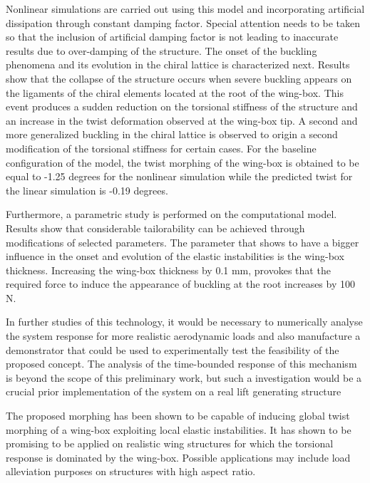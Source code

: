 Nonlinear simulations are carried out using this model and incorporating artificial dissipation through constant damping factor. Special attention needs to be taken so that the inclusion of artificial damping factor is not leading to inaccurate results due to over-damping of the structure. The onset of the buckling phenomena and its evolution in the chiral lattice is characterized next. Results show that the collapse of the structure occurs when severe buckling appears on the ligaments of the chiral elements located at the root of the wing-box. This event produces a sudden reduction on the torsional stiffness of the structure and an increase in the twist deformation observed at the wing-box tip. A second and more generalized buckling in the chiral lattice is observed to origin a second modification of the torsional stiffness for certain cases. For the baseline configuration of the model, the twist morphing of the wing-box is obtained to be equal to -1.25 degrees for the nonlinear simulation while the predicted twist for the linear simulation is -0.19 degrees.

Furthermore, a parametric study is performed on the computational model. Results show that considerable tailorability can be achieved through modifications of selected parameters. The parameter that shows to have a bigger influence in the onset and evolution of the elastic instabilities is the wing-box thickness. Increasing the wing-box thickness by 0.1 mm, provokes that the required force to induce the appearance of buckling at the root increases by 100 N. 

In further studies of this technology, it would be necessary to numerically analyse the system response for more realistic aerodynamic loads and also manufacture a demonstrator that could be used to experimentally test the feasibility of the proposed concept. The analysis of the time-bounded response of this mechanism is beyond the scope of this preliminary work, but such a investigation would be a crucial prior implementation of the system on a real lift generating structure

The proposed morphing has been shown to be capable of inducing global twist morphing of a wing-box exploiting local elastic instabilities. It has shown to be promising to be applied on realistic wing structures for which the torsional response is dominated by the wing-box. Possible applications may include load alleviation purposes on structures with high aspect ratio. 
